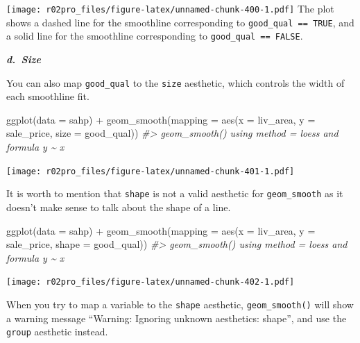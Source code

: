 \documentclass[
]{book}
\newenvironment{Shaded}{\begin{snugshade}}{\end{snugshade}}
\newcommand{\AttributeTok}[1]{\textcolor[rgb]{0.77,0.63,0.00}{#1}}
\newcommand{\CommentTok}[1]{\textcolor[rgb]{0.56,0.35,0.01}{\textit{#1}}}
\newcommand{\FunctionTok}[1]{\textcolor[rgb]{0.00,0.00,0.00}{#1}}
\newcommand{\NormalTok}[1]{#1}
\newcommand{\SpecialCharTok}[1]{\textcolor[rgb]{0.00,0.00,0.00}{#1}}
\begin{document}
\texttt{[image: r02pro\_files/figure-latex/unnamed-chunk-400-1.pdf]}
The plot shows a dashed line for the smoothline corresponding to \texttt{good\_qual\ ==\ TRUE}, and a solid line for the smoothline corresponding to \texttt{good\_qual\ ==\ FALSE}.

\textbf{\emph{d.~Size}}

You can also map \texttt{good\_qual} to the \texttt{size} aesthetic, which controls the width of each smoothline fit.

\begin{Shaded}
\begin{Highlighting}[]
\FunctionTok{ggplot}\NormalTok{(}\AttributeTok{data =}\NormalTok{ sahp) }\SpecialCharTok{+} \FunctionTok{geom\_smooth}\NormalTok{(}\AttributeTok{mapping =} \FunctionTok{aes}\NormalTok{(}\AttributeTok{x =}\NormalTok{ liv\_area, }\AttributeTok{y =}\NormalTok{ sale\_price, }\AttributeTok{size =}\NormalTok{ good\_qual))}
\CommentTok{\#\textgreater{} \textasciigrave{}geom\_smooth()\textasciigrave{} using method = \textquotesingle{}loess\textquotesingle{} and formula \textquotesingle{}y \textasciitilde{} x\textquotesingle{}}
\end{Highlighting}
\end{Shaded}

\texttt{[image: r02pro\_files/figure-latex/unnamed-chunk-401-1.pdf]}

It is worth to mention that \texttt{shape} is not a valid aesthetic for \texttt{geom\_smooth} as it doesn't make sense to talk about the shape of a line.

\begin{Shaded}
\begin{Highlighting}[]
\FunctionTok{ggplot}\NormalTok{(}\AttributeTok{data =}\NormalTok{ sahp) }\SpecialCharTok{+} \FunctionTok{geom\_smooth}\NormalTok{(}\AttributeTok{mapping =} \FunctionTok{aes}\NormalTok{(}\AttributeTok{x =}\NormalTok{ liv\_area, }\AttributeTok{y =}\NormalTok{ sale\_price, }\AttributeTok{shape =}\NormalTok{ good\_qual))}
\CommentTok{\#\textgreater{} \textasciigrave{}geom\_smooth()\textasciigrave{} using method = \textquotesingle{}loess\textquotesingle{} and formula \textquotesingle{}y \textasciitilde{} x\textquotesingle{}}
\end{Highlighting}
\end{Shaded}

\texttt{[image: r02pro\_files/figure-latex/unnamed-chunk-402-1.pdf]}

When you try to map a variable to the \texttt{shape} aesthetic, \texttt{geom\_smooth()} will show a warning message ``Warning: Ignoring unknown aesthetics: shape'', and use the \texttt{group} aesthetic instead.
\end{document}
